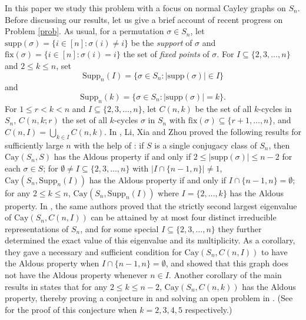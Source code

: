 \documentclass[12pt, a4paper]{article}
\def\fix{\mathrm{fix}}
\theoremstyle{definition}
\begin{document}
In this paper we study this problem with a focus on normal Cayley graphs on $S_n$. Before discussing our results, let us give a brief account of recent progress on Problem \ref{prob}. As usual, for a permutation $\sigma\in S_n$, let $\mathrm{supp}(\sigma)=\{i\in [n] : \sigma(i)\ne i\}$ be the \emph{support} of $\sigma$ and $\fix(\sigma) = \{i \in [n] : \sigma(i) = i\}$ the set of \emph{fixed points} of $\sigma$. For $I\subseteq \{2,3,\ldots,n\}$ and $2\leq k\leq n$, set
$$
\mathrm{Supp}_n(I) = \{ \sigma \in S_n : |\mathrm{supp}(\sigma)| \in I \}
$$
and
$$
\mathrm{Supp}_n(k) = \{ \sigma \in S_n : |\mathrm{supp}(\sigma)| = k \}.
$$
For $1 \leq r < k < n$ and $I\subseteq \{2,3,\ldots,n\}$, let $C(n,k)$ be the set of all $k$-cycles in $S_n$, $C(n,k;r)$ the set of all $k$-cycles $\sigma$ in $S_n$ with $\fix(\sigma) \subseteq \{r+1, \ldots, n\}$, and $C(n,I)=\bigcup_{k\in I} C(n,k)$. In \cite{LXZ}, Li, Xia and Zhou proved the following results for sufficiently large $n$ with the help of \cite[Proposition 2.3]{PP}: if $S$ is a single conjugacy class of $S_n$, then $\mathrm{Cay}(S_n,S)$ has the Aldous property if and only if $2\leq |\mathrm{supp}(\sigma)|\leq n-2$ for each $\sigma\in S$; for $\emptyset\ne I\subseteq \{2,3,\ldots,n\}$ with $|I\cap \{n-1,n\}|\ne 1$, $\mathrm{Cay}(S_n,\mathrm{Supp}_n(I))$ has the Aldous property if and only if $I\cap \{n-1,n\}=\emptyset$; for any $2 \le k \le n$, $\mathrm{Cay}(S_n,\mathrm{Supp}_n(I))$ where $I=\{2, \ldots, k\}$ has the Aldous property. In \cite{LXZJCTA2024}, the same authors proved that the strictly second largest eigenvalue of $\mathrm{Cay}(S_n,C(n,I))$ can be attained by at most four distinct irreducible representations of $S_n$, and for some special $I\subseteq \{2,3,\ldots,n\}$ they further determined the exact value of this eigenvalue and its multiplicity. As a corollary, they gave a necessary and sufficient condition for $\mathrm{Cay}(S_n,C(n,I))$ to have the Aldous property when $I\cap \{n-1,n\}=\emptyset$, and showed that this graph does not have the Aldous property whenever $n\in I$. Another corollary of the main results in \cite{LXZJCTA2024} states that for any $2 \le k \le n-2$, $\mathrm{Cay}(S_n,C(n,k))$ has the Aldous property, thereby proving a conjecture in \cite[Conjecture 1.4]{MR} and solving an open problem in \cite{SZ}. (See \cite{DS,HH,HH2,MR} for the proof of this conjecture when $k=2,3,4,5$ respectively.) 
\end{document}

